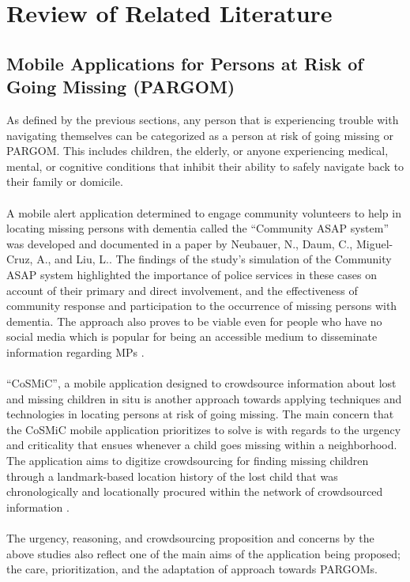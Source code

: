 \chapter{Review of Related Literature}
\label{sec:relatedlit}

\section{Mobile Applications for Persons at Risk of Going Missing (PARGOM)}

As defined by the previous sections, any person that is experiencing trouble with navigating themselves can be categorized as a person at risk of going missing or PARGOM. This includes children, the elderly, or anyone experiencing medical, mental, or cognitive conditions that inhibit their ability to safely navigate back to their family or domicile. 
\\\\A mobile alert application determined to engage community volunteers to help in locating missing persons with dementia called the “Community ASAP system” was developed and documented in a paper by Neubauer, N., Daum, C., Miguel-Cruz, A., and Liu, L.. The findings of the study’s simulation of the Community ASAP system highlighted the importance of police services in these cases on account of their primary and direct involvement, and the effectiveness of community response and participation to the occurrence of missing persons with dementia. The approach also proves to be viable even for people who have no social media which is popular for being an accessible medium to disseminate information regarding MPs \cite{neubauer2021mobile}.
\\\\“CoSMiC”, a mobile application designed to crowdsource information about lost and missing children in situ is another approach towards applying techniques and technologies in locating persons at risk of going missing. The main concern that the CoSMiC mobile application prioritizes to solve is with regards to the urgency and criticality that ensues whenever a child goes missing within a neighborhood. The application aims to digitize crowdsourcing for finding missing children through a landmark-based location history of the lost child that was chronologically and locationally procured within the network of crowdsourced information \cite{shin2014cosmic}.
\\\\The urgency, reasoning, and crowdsourcing proposition and concerns by the above studies also reflect one of the main aims of the application being proposed; the care, prioritization, and the adaptation of approach towards PARGOMs.


